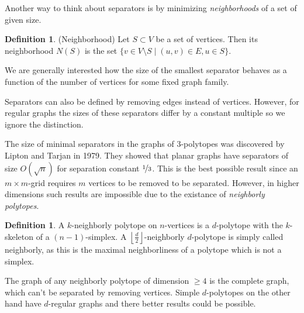 \documentclass[a4paper,12pt]{book}
\theoremstyle{plain}
\newtheorem{conjecture}[theorem]{Conjecture}
\theoremstyle{definition}
\newtheorem{definition}[theorem]{Definition}
\newcommand\NC{\textrm{NCP}}
\begin{document}
Another way to think about separators is by minimizing \textit{neighborhoods} 
of a set of given size.

\begin{definition}
 (Neighborhood) Let $S \subset V$ be a set of vertices. Then its neighborhood 
$N(S)$ is the set $\{v \in V\setminus S \mid (u,v) \in E, u \in S\}$. 
\end{definition}

We are generally interested how the size of the smallest separator behaves as a 
function 
of the number of vertices for some fixed graph family.

Separators can also be defined by removing edges instead of vertices. However, 
for regular graphs the sizes of these separators differ by a constant multiple 
so we ignore the distinction.

The size of minimal separators in the graphs of 3-polytopes was discovered by 
Lipton and Tarjan \cite{LiTa} in 1979. They showed that planar graphs have 
separators of size $O(\sqrt{n})$ for separation constant $\nicefrac{1}{3}$. This is 
the best possible result since an $m\times m$-grid requires $m$ vertices to be 
removed to be separated. However, in higher dimensions such results are 
impossible due to the existance of \textit{neighborly polytopes}.

\begin{definition}
 A $k$-neighborly polytope on $n$-vertices is a $d$-polytope with the $k$-skeleton of a $(n-1)$-simplex.
A $\left\lfloor \frac{d}{2} \right\rfloor$-neighborly $d$-polytope is simply called neighborly, as this is the maximal
neighborliness of a polytope which is not a simplex.
\end{definition}

The graph of any neighborly polytope of dimension $\geq 4$ is the complete graph, which can't be separated by removing vertices. Simple 
$d$-polytopes on the other hand have $d$-regular graphs and there better results could be 
possible. 

%
%
%
%
\end{document}
